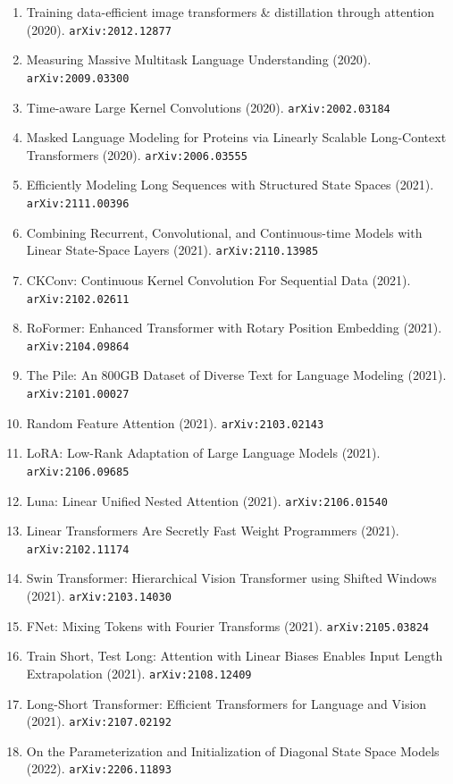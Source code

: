 \documentclass[11pt]{article}
\begin{document}
\begin{enumerate}
  \item Training data-efficient image transformers \& distillation through
  attention (2020). \texttt{arXiv:2012.12877}
  \item Measuring Massive Multitask Language Understanding (2020). \texttt{arXiv:2009.03300}
  \item Time-aware Large Kernel Convolutions (2020). \texttt{arXiv:2002.03184}
  \item Masked Language Modeling for Proteins via Linearly Scalable Long-Context
  Transformers (2020). \texttt{arXiv:2006.03555}
  \item Efficiently Modeling Long Sequences with Structured State Spaces (2021). \texttt{arXiv:2111.00396}
  \item Combining Recurrent, Convolutional, and Continuous-time Models with
  Linear State-Space Layers (2021). \texttt{arXiv:2110.13985}
  \item CKConv: Continuous Kernel Convolution For Sequential Data (2021). \texttt{arXiv:2102.02611}
  \item RoFormer: Enhanced Transformer with Rotary Position Embedding (2021). \texttt{arXiv:2104.09864}
  \item The Pile: An 800GB Dataset of Diverse Text for Language Modeling (2021). \texttt{arXiv:2101.00027}
  \item Random Feature Attention (2021). \texttt{arXiv:2103.02143}
  \item LoRA: Low-Rank Adaptation of Large Language Models (2021). \texttt{arXiv:2106.09685}
  \item Luna: Linear Unified Nested Attention (2021). \texttt{arXiv:2106.01540}
  \item Linear Transformers Are Secretly Fast Weight Programmers (2021). \texttt{arXiv:2102.11174}
  \item Swin Transformer: Hierarchical Vision Transformer using Shifted Windows (2021). \texttt{arXiv:2103.14030}
  \item FNet: Mixing Tokens with Fourier Transforms (2021). \texttt{arXiv:2105.03824}
  \item Train Short, Test Long: Attention with Linear Biases Enables Input
  Length Extrapolation (2021). \texttt{arXiv:2108.12409}
  \item Long-Short Transformer: Efficient Transformers for Language and Vision (2021). \texttt{arXiv:2107.02192}
  \item On the Parameterization and Initialization of Diagonal State Space
  Models (2022). \texttt{arXiv:2206.11893}

\end{enumerate}
\end{document}
